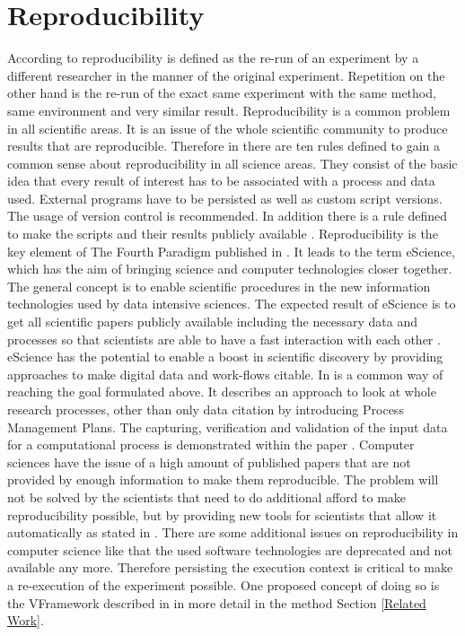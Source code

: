 \documentclass[draft,final]{vutinfth} %
\begin{document}
\section{Reproducibility}\label{Reproducibility}
According to \cite{6064509} reproducibility is defined as the re-run of an experiment by a different researcher in the manner of the original experiment. Repetition on the other hand is the re-run of the exact same experiment with the same method, same environment and very similar result. 
Reproducibility is a common problem in all scientific areas. It is an issue of the whole scientific community to produce results that are reproducible. Therefore in \cite{10.1371/journal.pcbi.1003285} there are ten rules defined to gain a common sense about reproducibility in all science areas. They consist of the basic idea that every result of interest has to be associated with a process and data used. External programs have to be persisted as well as custom script versions. The usage of version control is recommended. In addition there is a rule defined to make the scripts and their results publicly available \cite{10.1371/journal.pcbi.1003285}. 
Reproducibility is the key element of The Fourth Paradigm published in \cite{noauthororeditorfourth}. It leads to the term eScience, which has the aim of bringing science and computer technologies closer together. The general concept is to enable scientific procedures in the new information technologies used by data intensive sciences. The expected result of eScience is to get all scientific papers publicly available including the necessary data and processes so that scientists are able to have a fast interaction with each other \cite{noauthororeditorfourth}. 
eScience has the potential to enable a boost in scientific discovery by providing approaches to make digital data and work-flows citable. In \cite{Rauber2015RepeatabilityAR} is a common way of reaching the goal formulated above. It describes an approach to look at whole research processes, other than only data citation by introducing Process Management Plans. The capturing, verification and validation of the input data for a computational process is demonstrated within the paper \cite{Rauber2015RepeatabilityAR}.
Computer sciences have the issue of a high amount of published papers that are not provided by enough information to make them reproducible. The problem will not be solved by the scientists that need to do additional afford to make reproducibility possible, but by providing new tools for scientists that allow it automatically as stated in \cite{MIKSA201725}. There are some additional issues on reproducibility in computer science like that the used software technologies are deprecated and not available any more. Therefore persisting the execution context is critical to make a re-execution of the experiment possible. One proposed concept of doing so is the VFramework described in in more detail in the method Section \ref{Related Work}.
\end{document}
